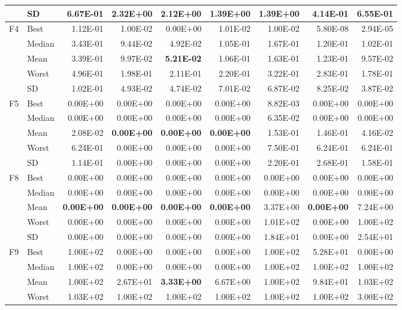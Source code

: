 \documentclass[10pt,a4paper]{article}
\newcommand{\bestval}[1]{\textbf{#1}}
\begin{document}
\begin{table}[p]
\begin{tabular}{llrrrrrrr}
 & SD & 6.67E-01 & 2.32E+00 & 2.12E+00 & 1.39E+00 & 1.39E+00 & 4.14E-01 & 6.55E-01 \\
\midrule
F4 & Best & 1.12E-01 & 1.00E-02 & 0.00E+00 & 1.01E-02 & 1.00E-02 & 5.80E-08 & 2.94E-05 \\
 & Median & 3.43E-01 & 9.44E-02 & 4.92E-02 & 1.05E-01 & 1.67E-01 & 1.20E-01 & 1.02E-01 \\
 & Mean & 3.39E-01 & 9.97E-02 & \bestval{5.21E-02} & 1.06E-01 & 1.63E-01 & 1.23E-01 & 9.57E-02 \\
 & Worst & 4.96E-01 & 1.98E-01 & 2.11E-01 & 2.20E-01 & 3.22E-01 & 2.83E-01 & 1.78E-01 \\
 & SD & 1.02E-01 & 4.93E-02 & 4.74E-02 & 7.01E-02 & 6.87E-02 & 8.25E-02 & 3.87E-02 \\
\midrule
F5 & Best & 0.00E+00 & 0.00E+00 & 0.00E+00 & 0.00E+00 & 8.82E-03 & 0.00E+00 & 0.00E+00 \\
 & Median & 0.00E+00 & 0.00E+00 & 0.00E+00 & 0.00E+00 & 6.35E-02 & 0.00E+00 & 0.00E+00 \\
 & Mean & 2.08E-02 & \bestval{0.00E+00} & \bestval{0.00E+00} & \bestval{0.00E+00} & 1.53E-01 & 1.46E-01 & 4.16E-02 \\
 & Worst & 6.24E-01 & 0.00E+00 & 0.00E+00 & 0.00E+00 & 7.50E-01 & 6.24E-01 & 6.24E-01 \\
 & SD & 1.14E-01 & 0.00E+00 & 0.00E+00 & 0.00E+00 & 2.20E-01 & 2.68E-01 & 1.58E-01 \\
\midrule
F8 & Best & 0.00E+00 & 0.00E+00 & 0.00E+00 & 0.00E+00 & 0.00E+00 & 0.00E+00 & 0.00E+00 \\
 & Median & 0.00E+00 & 0.00E+00 & 0.00E+00 & 0.00E+00 & 0.00E+00 & 0.00E+00 & 0.00E+00 \\
 & Mean & \bestval{0.00E+00} & \bestval{0.00E+00} & \bestval{0.00E+00} & \bestval{0.00E+00} & 3.37E+00 & \bestval{0.00E+00} & 7.24E+00 \\
 & Worst & 0.00E+00 & 0.00E+00 & 0.00E+00 & 0.00E+00 & 1.01E+02 & 0.00E+00 & 1.00E+02 \\
 & SD & 0.00E+00 & 0.00E+00 & 0.00E+00 & 0.00E+00 & 1.84E+01 & 0.00E+00 & 2.54E+01 \\
\midrule
F9 & Best & 1.00E+02 & 0.00E+00 & 0.00E+00 & 0.00E+00 & 1.00E+02 & 5.28E+01 & 0.00E+00 \\
 & Median & 1.00E+02 & 0.00E+00 & 0.00E+00 & 0.00E+00 & 1.00E+02 & 1.00E+02 & 1.00E+02 \\
 & Mean & 1.00E+02 & 2.67E+01 & \bestval{3.33E+00} & 6.67E+00 & 1.00E+02 & 9.84E+01 & 1.03E+02 \\
 & Worst & 1.03E+02 & 1.00E+02 & 1.00E+02 & 1.00E+02 & 1.00E+02 & 1.00E+02 & 3.00E+02 \\

\end{tabular}
\end{table}
\end{document}
